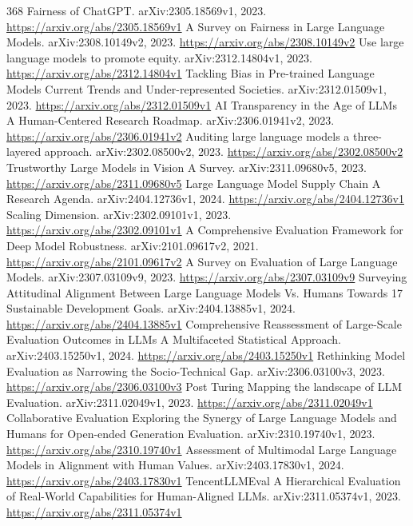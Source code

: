 \documentclass[11pt]{article}
\begin{document}
\begin{thebibliography}{368}
 Fairness of ChatGPT. arXiv:2305.18569v1, 2023. \url{https://arxiv.org/abs/2305.18569v1}
 A Survey on Fairness in Large Language Models. arXiv:2308.10149v2, 2023. \url{https://arxiv.org/abs/2308.10149v2}
 Use large language models to promote equity. arXiv:2312.14804v1, 2023. \url{https://arxiv.org/abs/2312.14804v1}
 Tackling Bias in Pre-trained Language Models Current Trends and Under-represented Societies. arXiv:2312.01509v1, 2023. \url{https://arxiv.org/abs/2312.01509v1}
 AI Transparency in the Age of LLMs A Human-Centered Research Roadmap. arXiv:2306.01941v2, 2023. \url{https://arxiv.org/abs/2306.01941v2}
 Auditing large language models a three-layered approach. arXiv:2302.08500v2, 2023. \url{https://arxiv.org/abs/2302.08500v2}
 Trustworthy Large Models in Vision A Survey. arXiv:2311.09680v5, 2023. \url{https://arxiv.org/abs/2311.09680v5}
 Large Language Model Supply Chain A Research Agenda. arXiv:2404.12736v1, 2024. \url{https://arxiv.org/abs/2404.12736v1}
 Scaling Dimension. arXiv:2302.09101v1, 2023. \url{https://arxiv.org/abs/2302.09101v1}
 A Comprehensive Evaluation Framework for Deep Model Robustness. arXiv:2101.09617v2, 2021. \url{https://arxiv.org/abs/2101.09617v2}
 A Survey on Evaluation of Large Language Models. arXiv:2307.03109v9, 2023. \url{https://arxiv.org/abs/2307.03109v9}
 Surveying Attitudinal Alignment Between Large Language Models Vs. Humans Towards 17 Sustainable Development Goals. arXiv:2404.13885v1, 2024. \url{https://arxiv.org/abs/2404.13885v1}
 Comprehensive Reassessment of Large-Scale Evaluation Outcomes in LLMs A Multifaceted Statistical Approach. arXiv:2403.15250v1, 2024. \url{https://arxiv.org/abs/2403.15250v1}
 Rethinking Model Evaluation as Narrowing the Socio-Technical Gap. arXiv:2306.03100v3, 2023. \url{https://arxiv.org/abs/2306.03100v3}
 Post Turing Mapping the landscape of LLM Evaluation. arXiv:2311.02049v1, 2023. \url{https://arxiv.org/abs/2311.02049v1}
 Collaborative Evaluation Exploring the Synergy of Large Language Models and Humans for Open-ended Generation Evaluation. arXiv:2310.19740v1, 2023. \url{https://arxiv.org/abs/2310.19740v1}
 Assessment of Multimodal Large Language Models in Alignment with Human Values. arXiv:2403.17830v1, 2024. \url{https://arxiv.org/abs/2403.17830v1}
 TencentLLMEval A Hierarchical Evaluation of Real-World Capabilities for Human-Aligned LLMs. arXiv:2311.05374v1, 2023. \url{https://arxiv.org/abs/2311.05374v1}

\end{thebibliography}
\end{document}
